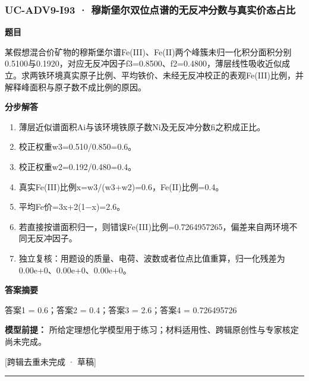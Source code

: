 \documentclass[UTF8,11pt,a4paper]{ctexart}
\begin{document}
\subsubsection*{UC-ADV9-I93 · 穆斯堡尔双位点谱的无反冲分数与真实价态占比}
\noindent\textbf{题目}\par
某假想混合价矿物的穆斯堡尔谱Fe(III)、Fe(II)两个峰簇未归一化积分面积分别0.5100与0.1920，对应无反冲因子f3=0.8500、f2=0.4800，薄层线性吸收近似成立。求两铁环境真实原子比例、平均铁价、未经无反冲校正的表观Fe(III)比例，并解释峰面积与原子数不成比例的原因。\par
\medskip\noindent\textbf{分步解答}
\begin{enumerate}
\item 薄层近似谱面积Ai与该环境铁原子数Ni及无反冲分数fi之积成正比。
\item 校正权重w3=0.510/0.850=0.6。
\item 校正权重w2=0.192/0.480=0.4。
\item 真实Fe(III)比例x=w3/(w3+w2)=0.6，Fe(II)比例=0.4。
\item 平均Fe价=3x+2(1−x)=2.6。
\item 若直接按谱面积归一，则错误Fe(III)比例=0.7264957265，偏差来自两环境不同无反冲因子。
\item 独立复核：用题设的质量、电荷、波数或者位点比值重算，归一化残差为0.00e+0、0.00e+0、0.00e+0。
\end{enumerate}
\noindent\textbf{答案摘要}\par
答案1 = 0.6；答案2 = 0.4；答案3 = 2.6；答案4 = 0.726495726\par
\noindent\textbf{模型前提：}
所给定理想化学模型用于练习；材料适用性、跨辑原创性与专家核定尚未完成。\par
\noindent\textcolor{red!65!black}{[跨辑去重未完成 · 草稿]} \par
\medskip\hrule\medskip
{}
\end{document}
